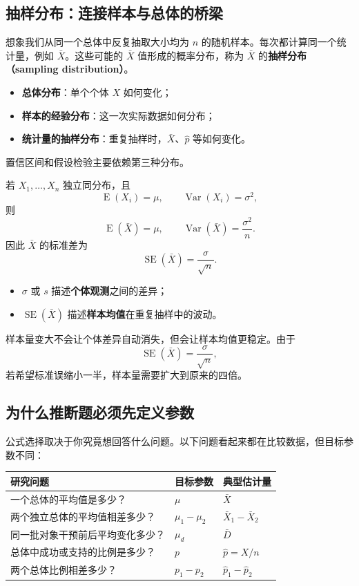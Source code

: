 \documentclass[11pt,a4paper]{article}
\newcommand{\E}{\operatorname{E}}
\newcommand{\Var}{\operatorname{Var}}
\newcommand{\SE}{\operatorname{SE}}
\begin{document}
\subsection{抽样分布：连接样本与总体的桥梁}

想象我们从同一个总体中反复抽取大小均为 $n$ 的随机样本。每次都计算同一个统计量，例如 $\bar X$。这些可能的 $\bar X$ 值形成的概率分布，称为 $\bar X$ 的\textbf{抽样分布（sampling distribution）}。

\begin{intuitionbox}[不要把三个分布混在一起]
\begin{itemize}
  \item \textbf{总体分布}：单个个体 $X$ 如何变化；
  \item \textbf{样本的经验分布}：这一次实际数据如何分布；
  \item \textbf{统计量的抽样分布}：重复抽样时，$\bar X$、$\hat p$ 等如何变化。
\end{itemize}
置信区间和假设检验主要依赖第三种分布。
\end{intuitionbox}

若 $X_1,\ldots,X_n$ 独立同分布，且
\[
  \E(X_i)=\mu,
  \qquad
  \Var(X_i)=\sigma^2,
\]
则
\[
  \E(\bar X)=\mu,
  \qquad
  \Var(\bar X)=\frac{\sigma^2}{n}.
\]
因此 $\bar X$ 的标准差为
\[
  \boxed{\SE(\bar X)=\frac{\sigma}{\sqrt n}.}
\]

\begin{conceptbox}[标准差与标准误的区别]
\begin{itemize}
  \item $\sigma$ 或 $s$ 描述\textbf{个体观测}之间的差异；
  \item $\SE(\bar X)$ 描述\textbf{样本均值}在重复抽样中的波动。
\end{itemize}
样本量变大不会让个体差异自动消失，但会让样本均值更稳定。由于
\[
  \SE(\bar X)=\frac{\sigma}{\sqrt n},
\]
若希望标准误缩小一半，样本量需要扩大到原来的四倍。
\end{conceptbox}

\subsection{为什么推断题必须先定义参数}

公式选择取决于你究竟想回答什么问题。以下问题看起来都在比较数据，但目标参数不同：

\begin{center}
\renewcommand{\arraystretch}{1.25}
\begin{tabularx}{\textwidth}{p{6.0cm}p{3.0cm}X}
\toprule
研究问题 & 目标参数 & 典型估计量\\
\midrule
一个总体的平均值是多少？ & $\mu$ & $\bar X$\\
两个独立总体的平均值相差多少？ & $\mu_1-\mu_2$ & $\bar X_1-\bar X_2$\\
同一批对象干预前后平均变化多少？ & $\mu_d$ & $\bar D$\\
总体中成功或支持的比例是多少？ & $p$ & $\hat p=X/n$\\
两个总体比例相差多少？ & $p_1-p_2$ & $\hat p_1-\hat p_2$\\
\bottomrule
\end{tabularx}
\end{center}
\end{document}
